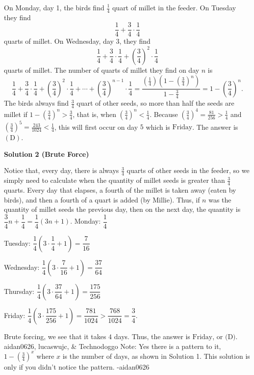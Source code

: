 \begin{enumerate}
On Monday, day 1, the birds find $\frac 14$ quart of millet in the feeder.  On Tuesday they find
 \[\frac 14 + \frac 34 \cdot \frac 14\]quarts of millet.  On Wednesday, day 3, they find
 \[\frac 14 + \frac 34 \cdot \frac 14 + \left(\frac34\right)^2 \cdot \frac 14\]quarts of millet.  The number of quarts of millet they find on day $n$ is
 \[\frac 14 + \frac 34 \cdot \frac 14 + \left(\frac34\right)^2 \cdot \frac 14 + \cdots + \left(\frac 34\right)^{n-1} \cdot \frac 14 = \frac {(\frac 14)(1 - (\frac 34)^n)}{1 - \frac 34} = 1 - \left(\frac 34\right)^n .\]The birds always find $\frac 34$ quart of other seeds, so more than half the seeds are millet if $1 - \left(\frac 34\right)^n > \frac 34$, that is, when $\left(\frac 34\right)^n < \frac 14$.  Because $\left(\frac 34\right)^4 = \frac {81}{256} > \frac 14$ and $\left(\frac 34\right)^5 = \frac {243}{1024} < \frac 14$, this will first occur on day $5$ which is $\boxed {\text{Friday}}$. The answer is $\mathrm{(D)}$.

 



\textbf{Solution 2 (Brute Force)}

Notice that, every day, there is always $\frac34$ quarts of other seeds in the feeder, so we simply need to calculate when the quantity of millet seeds is greater than $\frac34$ quarts. Every day that elapses, a fourth of the millet is taken away (eaten by birds), and then a fourth of a quart is added (by Millie). Thus, if $n$ was the quantity of millet seeds the previous day, then on the next day, the quantity is $\dfrac34n+\dfrac14=\dfrac14\left(3n+1\right).$ 
Monday: $\dfrac14\quad$

Tuesday: $\dfrac14\left(3\cdot\dfrac14+1\right)=\dfrac{7}{16}$

Wednesday: $\dfrac14\left(3\cdot\dfrac{7}{16}+1\right)=\dfrac{37}{64}$

Thursday: $\dfrac14\left(3\cdot\dfrac{37}{64}+1\right)=\dfrac{175}{256}$

Friday: $\dfrac14\left(3\cdot\dfrac{175}{256}+1\right)=\dfrac{781}{1024}>\dfrac{768}{1024}=\dfrac34.$

Brute forcing, we see that it takes $4$ days. Thus, the answer is $\boxed{\text{Friday}}$, or $\boxed{\text{(D)}}$. ~ aidan0626, lucaswujc, & Technodoggo
Note: Yes there is a pattern to it, $1-\left(\frac{3}{4}\right)^x$ where $x$ is the number of days, as shown in Solution 1. This solution is only if you didn't notice the pattern. -aidan0626

 




\end{enumerate}
